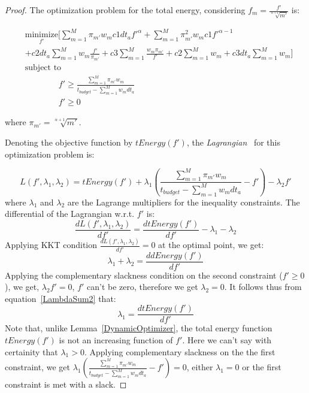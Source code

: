 \documentclass[11pt, letterpaper]{article}
\begin{document}
\begin{proof}
The optimization problem for the total energy, considering $f_m = \frac{f'}{\sqrt[\alpha+1]{m'}}$ is:

\begin{equation}\label{TotalEnergyFrequecy2}
\begin{aligned}
   &\underset{f'}{\text{minimize}} [\sum_{m=1}^{M}\pi_{m'}w_m c1dt_af'^{\alpha} + \sum_{m=1}^{M}\pi_{m'}^2 w_m c1f'^{\alpha-1} \\
 &+ c2dt_a\sum_{m=1}^{M} w_m \frac{f'}{\pi_{m'}}  +  c3\sum_{m=1}^{M}\frac{w_m\pi_{m'}}{f'}  + c2\sum_{m=1}^{M}w_m + c3dt_a\sum_{m=1}^{M}w_m]\\
 & \text{subject to}\\
 & \qquad \qquad f' \geq \frac{\sum_{m=1}^{M}\pi_{m'}w_m}{t_{budget} - \sum_{m=1}^{M}w_mdt_a}\\
 &\qquad \qquad f' \geq 0
\end{aligned}
 \end{equation}

where $\pi_{m'} =\sqrt[\alpha+1]{m'}$.

Denoting the objective function by $tEnergy(f')$, the \emph{Lagrangian}~\cite{Boyd} for this optimization problem is:

\begin{displaymath}
L(f', \lambda_1, \lambda_2) = tEnergy(f') +  \lambda_1(\frac{\sum_{m=1}^{M}\pi_{m'}w_m}{t_{budget} - \sum_{m=1}^{M}w_mdt_a} -f') -\lambda_2f'
\end{displaymath}
where $\lambda_1$ and $\lambda_2$ are the Lagrange multipliers for the inequality constraints.
The differential of the Lagrangian w.r.t. $f'$ is:
\begin{displaymath}
     \frac{d L(f', \lambda_1, \lambda_2)}{df'} =  \frac{dtEnergy(f')}{df'}  -\lambda_1 -\lambda_2
\end{displaymath}
Applying KKT condition  $\frac{d L(f', \lambda_1, \lambda_2)}{df'} = 0$ at the optimal point, we get:
\begin{equation}\label{LambdaSum2}
    \lambda_1 + \lambda_2  =  \frac{ddEnergy(f')}{df'}  
\end{equation}
Applying the complementary slackness condition on the second constraint ($f' \geq 0$), we get, $\lambda_2f' = 0$, $f'$ can't be zero, therefore we get  $\lambda_2 = 0$. It follows thus from equation~\ref{LambdaSum2}  that:
\begin{displaymath}
\lambda_1 =  \frac{dtEnergy(f')}{df'}  
\end{displaymath}
Note that, unlike Lemma~\ref{DynamicOptimizer}, the total energy function $tEnergy(f')$ is not an increasing function of $f'$.  Here we can't say with certainity that $\lambda_1 > 0$.
Applying complementary slackness on the the first constraint, we get $\lambda_1(\frac{\sum_{m=1}^{M}\pi_{m'}w_m}{t_{budget} - \sum_{m=1}^{M}w_mdt_a} -f') = 0$, either $\lambda_1 = 0$ or the first constraint is met with a slack. 


\end{proof}
\end{document}
